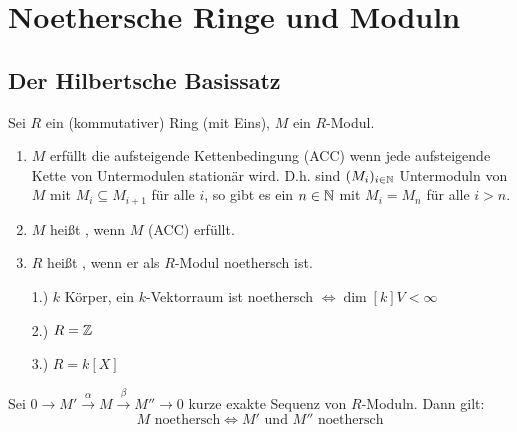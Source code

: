 \documentclass[a4paper, 10pt]{report}
\begin{document}
\chapter{Noethersche Ringe und Moduln}

\section{Der Hilbertsche Basissatz}

\begin{Def}
  Sei $R$ ein (kommutativer) Ring (mit Eins), $M$ ein $R$-Modul.
  \begin{enumerate}
    \item $M$ erfüllt die aufsteigende Kettenbedingung (ACC) wenn jede
          aufsteigende Kette von Untermodulen stationär wird. D.h. sind
          $(M_i)_{i \in \mathbb{N}}$ Untermoduln von $M$ mit $M_i \subseteq 
          M_{i+1}$ für alle $i$, so gibt es ein $n \in \mathbb{N}$ mit $M_i =
          M_n$ für alle $i > n$.
    \item $M$ heißt , wenn $M$ (ACC) erfüllt.
    \item $R$ heißt , wenn er als $R$-Modul noethersch ist.
\end{enumerate}
\end{Def}

\begin{nnBsp}
  \begin{enumerate}
    \item[1.)] $k$ Körper, ein $k$-Vektorraum ist noethersch $\Leftrightarrow
                 \dim[k]{V} < \infty$
    \item[2.)] $R = \mathbb{Z}$
    \item[3.)] $R = k[X]$
  \end{enumerate}
\end{nnBsp}

\begin{Bem}
\label{2.2}
  Sei $0 \to M' \overset{\alpha}{\to} M \overset{\beta}{\to} M'' \to 0$ kurze
  exakte Sequenz von $R$-Moduln. Dann gilt:
  \[M \text{ noethersch} \Leftrightarrow M' \text{ und } M'' \text{ noethersch}\]
\end{Bem}
\end{document}
